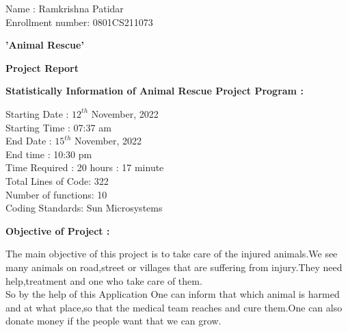 \documentclass[11]{article}
\begin{document}
Name : Ramkrishna Patidar\\

Enrollment number: 0801CS211073
\\
\begin{huge}
\begin{center}
\textbf{'Animal\hspace{5pt} Rescue' }
\end{center}
\end{huge}

\begin{large}
\begin{center}
\textbf{Project  Report} 
\end{center}
\end{large}
                
\begin{Large}
\textbf{Statistically Information of Animal Rescue Project Program :}
\end{Large}
 \vspace{0.25cm}

Starting Date      : $12^{th}$ November, 2022\\
Starting Time \hspace{10pt}     : 07:37 am\\
End Date  \hspace{29pt}       : $15^{th}$ November, 2022\\
End time           \hspace{1.2cm}: 10:30 pm\\            
Time Required   \hspace{7pt}    : 20 hours : 17 minute \\
Total Lines of Code: 322\\
Number of functions: 10\\
Coding Standards\hspace{0.5cm}: Sun Microsystems\\
\vspace{0.4cm}
\begin{large}
\textbf{Objective of Project :\\ \vspace{0.25cm}}
\end{large}


 The main objective of this project is to take care of the injured animals.We see many animals on road,street or villages that are suffering from injury.They need help,treatment and one who take care of them.\\ \vspace{0.1cm} 
So by the help of this Application One can inform that which animal is harmed and at what place,so that the medical team reaches and cure them.One can also donate money if the people want that we can grow.\vspace{0.25cm}
\end{document}
